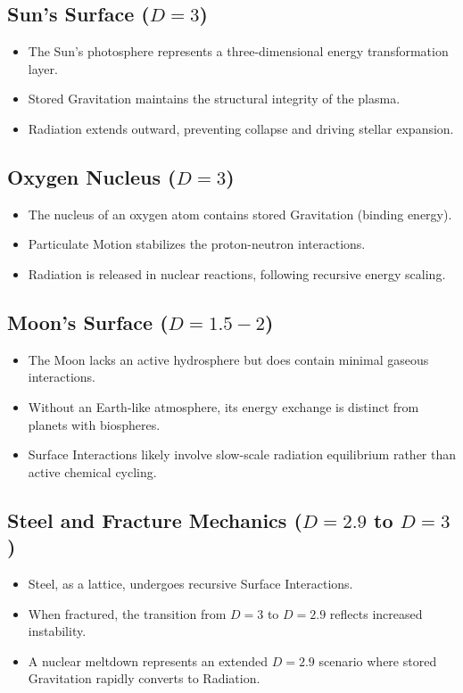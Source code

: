 \documentclass{article}
\begin{document}
\subsection{Sun's Surface ($D=3$)}
\begin{itemize}
    \item The Sun's photosphere represents a three-dimensional energy transformation layer.
    \item Stored Gravitation maintains the structural integrity of the plasma.
    \item Radiation extends outward, preventing collapse and driving stellar expansion.
\end{itemize}

\subsection{Oxygen Nucleus ($D=3$)}
\begin{itemize}
    \item The nucleus of an oxygen atom contains stored Gravitation (binding energy).
    \item Particulate Motion stabilizes the proton-neutron interactions.
    \item Radiation is released in nuclear reactions, following recursive energy scaling.
\end{itemize}

\subsection{Moon's Surface ($D=1.5 - 2$)}
\begin{itemize}
    \item The Moon lacks an active hydrosphere but does contain minimal gaseous interactions.
    \item Without an Earth-like atmosphere, its energy exchange is distinct from planets with biospheres.
    \item Surface Interactions likely involve slow-scale radiation equilibrium rather than active chemical cycling.
\end{itemize}

\subsection{Steel and Fracture Mechanics ($D=2.9$ to $D=3$)}
\begin{itemize}
    \item Steel, as a lattice, undergoes recursive Surface Interactions.
    \item When fractured, the transition from $D=3$ to $D=2.9$ reflects increased instability.
    \item A nuclear meltdown represents an extended $D=2.9$ scenario where stored Gravitation rapidly converts to Radiation.
\end{itemize}
\end{document}
